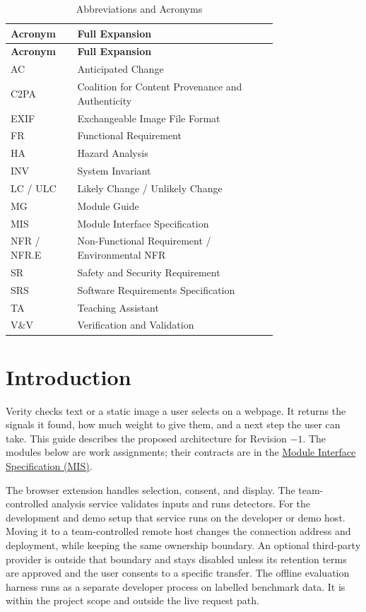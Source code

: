 \documentclass[12pt, titlepage]{article}
\newcommand{\repo}{https://github.com/richy1337/Verity}
\newcommand{\pdfbase}{\repo/blob/main/pdfs}
\begin{document}
\begin{longtable}{@{}lp{0.75\linewidth}@{}}
\caption{Abbreviations and Acronyms} \label{TblAcronyms}\\
\toprule
\textbf{Acronym} & \textbf{Full Expansion}\\
\midrule
\endfirsthead
\toprule
\textbf{Acronym} & \textbf{Full Expansion}\\
\midrule
\endhead
AC & Anticipated Change\\
C2PA & Coalition for Content Provenance and Authenticity\\
EXIF & Exchangeable Image File Format\\
FR & Functional Requirement\\
HA & Hazard Analysis\\
INV & System Invariant\\
LC / ULC & Likely Change / Unlikely Change\\
MG & Module Guide\\
MIS & Module Interface Specification\\
NFR / NFR.E & Non-Functional Requirement / Environmental NFR\\
SR & Safety and Security Requirement\\
SRS & Software Requirements Specification\\
TA & Teaching Assistant\\
V\&V & Verification and Validation\\
\bottomrule
\end{longtable}

\section{Introduction}

Verity checks text or a static image a user selects on a webpage. It returns the signals it found, how much weight to give them, and a next step the user can take. This guide describes the proposed architecture for Revision $-1$. The modules below are work assignments; their contracts are in the \href{\pdfbase/Design/SoftDetailedDes/MIS.pdf}{Module Interface Specification (MIS)}.

The browser extension handles selection, consent, and display. The team-controlled analysis service validates inputs and runs detectors. For the development and demo setup that service runs on the developer or demo host. Moving it to a team-controlled remote host changes the connection address and deployment, while keeping the same ownership boundary. An optional third-party provider is outside that boundary and stays disabled unless its retention terms are approved and the user consents to a specific transfer. The offline evaluation harness runs as a separate developer process on labelled benchmark data. It is within the project scope and outside the live request path.
\end{document}
